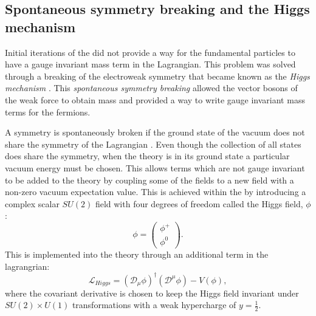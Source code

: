 \subsection{Spontaneous symmetry breaking and the Higgs mechanism}

Initial iterations of the \SM did not provide a way for the
fundamental particles to have a gauge invariant mass term in the
Lagrangian. This problem was solved through a breaking of
the electroweak symmetry that became known as the \emph{Higgs
mechanism}
\cite{Englert:1964et,Higgs:1964ia,Higgs:1964pj,Guralnik:1964eu,Higgs:1966ev,Kibble:1967sv}.
This \emph{spontaneous symmetry breaking} allowed the vector bosons of the
weak force to obtain mass and provided a way to write gauge invariant
mass terms for the fermions.

A symmetry is spontaneously broken if the ground state of
the vacuum does not share the symmetry of the Lagrangian
\cite{Griffiths:111880}. Even though the collection of all states does
share the symmetry, when the theory is in its ground state a
particular vacuum energy must be chosen. This allows terms which are
not gauge invariant to be added to the theory by coupling some of the
fields to a new field with a non-zero vacuum expectation value. This
is achieved within the \SM by introducing a complex scalar $SU(2)$
field with four degrees of freedom called the Higgs field, $\phi$:
\begin{equation}
\phi=\left(\begin{array}{c}\phi^+ \\ \phi^0 \end{array}\right).
\end{equation}
This is implemented into the theory through an additional term in the
\SM lagrangrian:
\begin{equation}
\mathcal{L}_{Higgs} =
(\mathcal{D}_{\mu}\phi)^{\dag}(\mathcal{D}^{\mu}\phi) - V(\phi),
\end{equation}
where the covariant derivative is chosen to keep the Higgs field
invariant under $SU(2)\times U(1)$ transformations with a weak
hypercharge of $y=\frac{1}{2}$.

